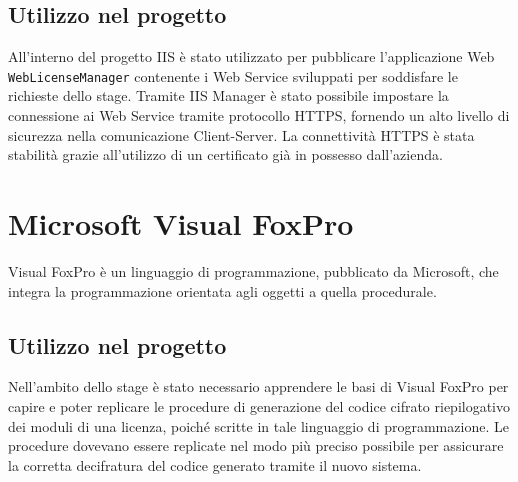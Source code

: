 \subsection{Utilizzo nel progetto}
All'interno del progetto IIS è stato utilizzato per pubblicare l'applicazione Web \texttt{WebLicenseManager} contenente i Web Service sviluppati per soddisfare le richieste dello stage. Tramite IIS Manager è stato possibile impostare la connessione ai Web Service tramite protocollo HTTPS, fornendo un alto livello di sicurezza nella comunicazione Client-Server. La connettività HTTPS è stata stabilità grazie all'utilizzo di un certificato già in possesso dall'azienda.

\section{Microsoft Visual FoxPro}
Visual FoxPro è un linguaggio di programmazione, pubblicato da Microsoft, che integra la programmazione orientata agli oggetti a quella procedurale.

\subsection{Utilizzo nel progetto}
Nell'ambito dello stage è stato necessario apprendere le basi di Visual FoxPro per capire e poter replicare le procedure di generazione del codice cifrato riepilogativo dei moduli di una licenza, poiché scritte in tale linguaggio di programmazione. Le procedure dovevano essere replicate nel modo più preciso possibile per assicurare la corretta decifratura del codice generato tramite il nuovo sistema. 